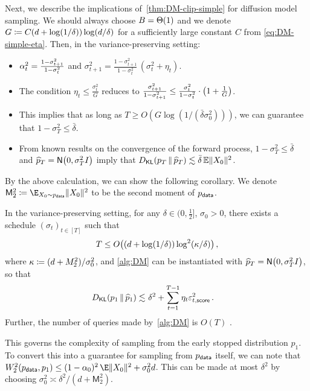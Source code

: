 Next, we describe the implications of~\cref{thm:DM-clip-simple} for diffusion model sampling.
We should always choose $\B=\Theta(1)$ %
and we denote $G\deq C(d+\log(1/\delta))\log(d/\delta)$ for a sufficiently large constant $C$ from \cref{eq:DM-simple-eta}.
Then, in the variance-preserving setting:%
\begin{itemize}
    \item {} $\alp_t^2=\frac{1-\sigma_{t+1}^2}{1-\sigma_t^2}$ and $\sigma_{t+1}^2=\frac{1-\sigma_{t+1}^2}{1-\sigma_t^2}\,(\sigma_{t}^2+\eta_{t})$.
    \item The condition $\eta_t\leq \frac{\sigma_t^2}{G}$ reduces to $\frac{\sigma_{t+1}^2}{1-\sigma_{t+1}^2}\leq \frac{\sigma_t^2}{1-\sigma_t^2}\cdot \prn*{1+\frac{1}{G}}$. 
    \item This implies that as long as $T\geq O(G\log(1/(\bar\delta \sigma_0^2)))$, we can guarantee that $1-\sigma_T^2\leq \bar\delta$.
    \item From known results on the convergence of the forward process, $1-\sigma_T^2 \le \bar\delta$ and $\phat_T=\normal{0,\sigma_T^2\Id}$ imply that $\kl{p_T}{\phat_T}\lesssim \bar\delta \En\nrm{X_0}^2$.

\end{itemize}
By the above calculation, we can show the following corollary. We denote $\mathsf M_2^2 \deq \E_{X_0\sim \pdata}\|X_0\|^2$ to be the second moment of $\pdata$.
\begin{corollary}\label{cor:poly-log}
In the variance-preserving setting, for any $\delta\in(0,\frac12]$, $\sigma_0>0$, there exists a schedule $(\sigma_t)_{t\in[T]}$ such that
\begin{align*}
    T\leq O\prn[\big]{(d+\log(1/\delta))\log^2(\kappa/\delta)}\,,
\end{align*}
where $\kappa\deq (d+M_2^2)/\sigma_0^2$, 
and \cref{alg:DM} can be instantiated with $\phat_T=\normal{0,\sigma_T^2\Id}$, so that
\begin{align*}
    \kl{p_1}{\phat_1}\leqsim&~ \delta^2+\sum_{t=1}^{T-1} \eta_t \epssct^2\,.
\end{align*}
Further, the number of queries made by~\cref{alg:DM} is $O(T)$ \whp.
\end{corollary}
    This governs the complexity of sampling from the early stopped distribution $p_1$.
    To convert this into a guarantee for sampling from $\pdata$ itself, we can note that $W_2^2(\pdata, p_1)\le (1-\alpha_0)^2\,\E\|X_0\|^2 + \sigma_0^2 d$.
    This can be made at most $\delta^2$ by choosing $\sigma_0^2 \asymp \delta^2/(d+\mathsf M_2^2)$.

